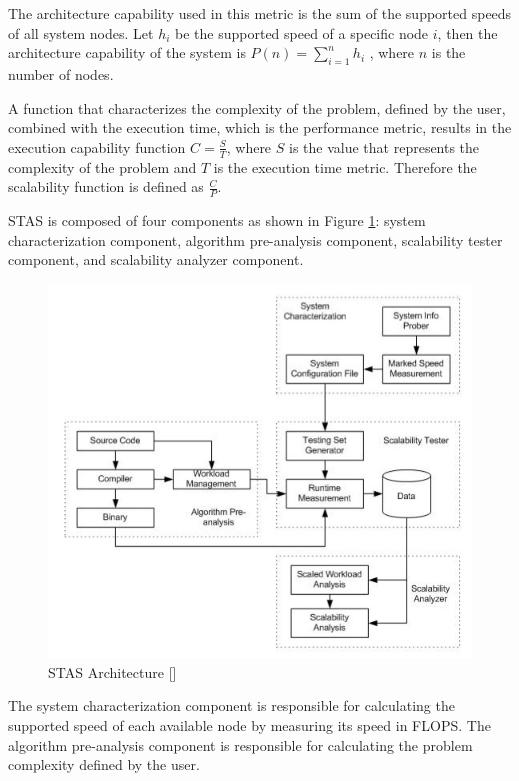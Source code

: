 The architecture capability used in this metric is the sum of the supported speeds of all system nodes. Let $h_{i}$ be the supported speed of a specific node $i$, then the architecture capability of the system is $P(n) = \sum_{i=1}^{n} h_i$ , where $n$ is the number of nodes. 

A function that characterizes the complexity of the problem, defined by the user, combined with the execution time, which is the performance metric, results in the execution capability function $C = \frac{S}{T}$, where $S$ is the value that represents the complexity of the problem and $T$ is the execution time metric. Therefore the scalability function is defined as $\frac{C}{P}$.

STAS is composed of four components as shown in Figure \ref{stasarchitecture}: system characterization component, algorithm pre-analysis component, scalability tester component, and scalability analyzer component.

\begin{figure}[htbp]
\begin{center}
	\includegraphics[scale=0.6]{images/stasarchitecture}
\caption{STAS Architecture [\cite{STAS}]}
\label{stasarchitecture}
\end{center}
\end{figure}

The system characterization component is responsible for calculating the supported speed of each available node by measuring its speed in FLOPS. The algorithm pre-analysis component is responsible for calculating the problem complexity defined by the user. 

